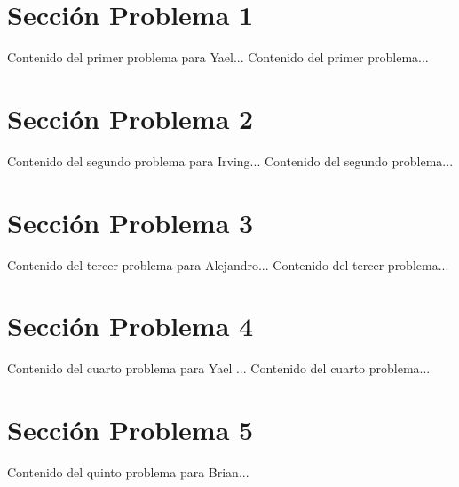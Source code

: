 \documentclass{IEEEcsmag}
\begin{document}
\section{Sección Problema 1}
Contenido del primer problema para Yael...
\newpage
Contenido del primer problema...
\newpage


\section{Sección Problema 2}
Contenido del segundo problema para Irving...
\newpage
Contenido del segundo problema...
\newpage


\section{Sección Problema 3}
Contenido del tercer problema para Alejandro...
\newpage 
Contenido del tercer problema...
\newpage 


\section{Sección Problema 4}
Contenido del cuarto problema para Yael ...
\newpage 
Contenido del cuarto problema...
\newpage 


\section{Sección Problema 5}
Contenido del quinto problema para Brian...
\newpage 
    
\end{document}
